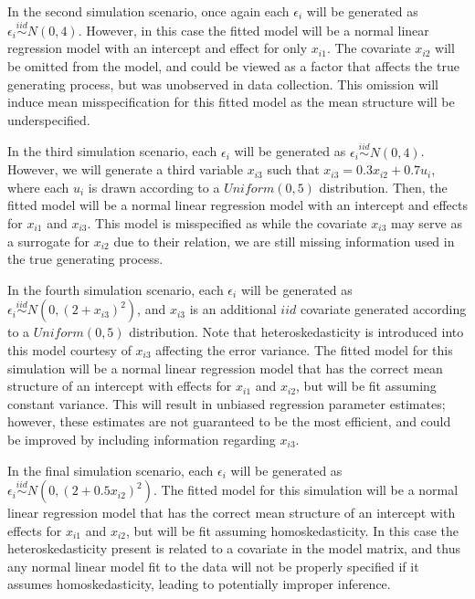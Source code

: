 \documentclass[submit]{smj}
\begin{document}
In the second simulation scenario, once again each $\epsilon_i$ will be generated as $\epsilon_i \stackrel{iid}{\sim} N(0,4)$.
However, in this case the fitted model will be a normal linear regression model with an intercept and effect for only
$x_{i1}$. The covariate $x_{i2}$ will be omitted from the model, and could be viewed as a factor that affects the true generating process, but
was unobserved in data collection. This omission will induce mean misspecification for this fitted model as the mean structure will be underspecified.

In the third simulation scenario, each $\epsilon_i$ will be generated as $\epsilon_i \stackrel{iid}{\sim} N(0,4)$. 
However, we will generate a third variable $x_{i3}$ such that $x_{i3} = 0.3 x_{i2} + 0.7 u_i$, where each $u_i$ is drawn according to a $Uniform(0,5)$ distribution.
Then, the fitted model will be a normal linear regression model with an intercept and effects for $x_{i1}$ and $x_{i3}$. This model is misspecified as while the covariate $x_{i3}$ 
may serve as a surrogate for $x_{i2}$ due to their relation, we are still missing information used in the true generating process.

In the fourth simulation scenario, each $\epsilon_i$ will be generated as $\epsilon_i \stackrel{iid}{\sim} N \left( 0,(2 + x_{i3})^2 \right)$, and $x_{i3}$ is an additional $iid$ covariate
generated according to a $Uniform(0,5)$ distribution. Note that heteroskedasticity is introduced into this model courtesy of $x_{i3}$ affecting the error variance. The fitted model for
this simulation will be a normal linear regression model that has the correct mean structure of an intercept with effects for $x_{i1}$ and $x_{i2}$, but will be fit assuming constant variance.
This will result in unbiased regression parameter estimates; however, these estimates are not guaranteed to be the most efficient, and could be improved by including information regarding $x_{i3}$.

In the final simulation scenario, each $\epsilon_i$ will be generated as $\epsilon_i \stackrel{iid}{\sim} N \left( 0,(2 + 0.5 x_{i2})^2 \right)$. The fitted model for this simulation will be a normal linear regression model that has the correct mean structure of an intercept with effects for $x_{i1}$ and $x_{i2}$,
but will be fit assuming homoskedasticity. In this case the heteroskedasticity present is related to a covariate in the model matrix, and thus any normal linear model fit to the data will not be properly
specified if it assumes homoskedasticity, leading to potentially improper inference.
\end{document}
